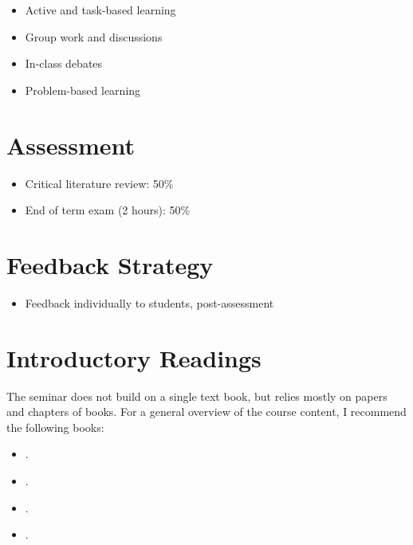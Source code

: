 \documentclass[abstract=on,parskip=full,headings=standardclasses,fontsize=11pt,paper=a4]{scrartcl}
\begin{document}
\begin{itemize}
\item Active and task-based learning
\item Group work and discussions
\item In-class debates
\item Problem-based learning
\end{itemize}

\section*{Assessment}

\begin{itemize}
\item Critical literature review: 50\%
\item End of term exam (2 hours): 50\%
\end{itemize}

\section*{Feedback Strategy}

\begin{itemize}
\item Feedback individually to students, post-assessment
\end{itemize}

\section*{Introductory Readings}

The seminar does not build on a single text book, but relies mostly on papers and chapters of books. For  a general overview of the course content, I recommend the following books:

\begin{itemize}
\item {}.
\item {}.
\item {}.
\item {}.
\end{itemize}
\end{document}
